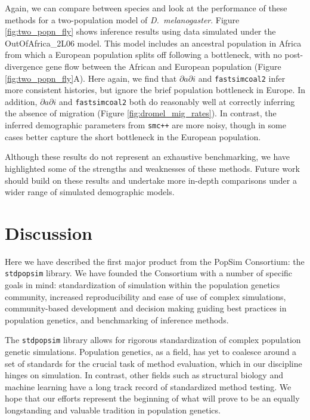 \documentclass[12pt,halfline,a4paper]{ouparticle}
\newcommand{\stdpopsim}{\texttt{stdpopsim}\xspace}
\newcommand{\dadi}{$\partial a \partial i$\xspace}
\newcommand{\smcpp}{\texttt{smc++}\xspace}
\newcommand{\fastsimcoal}{\texttt{fastsimcoal2}\xspace}
\begin{document}
Again, we can compare between species and look at the performance of these methods
for a two-population model of \textit{D.~melanogaster}. Figure
\ref{fig:two_popn_fly} shows inference results using data simulated under 
the OutOfAfrica\_2L06 model. This model includes an ancestral population in
Africa from which a European population splits off following a bottleneck, with no 
post-divergence gene flow between the African and European population (Figure \ref{fig:two_popn_fly}A).
Here again, we find that \dadi and \fastsimcoal infer more consistent histories,
but ignore the brief population bottleneck in Europe. In addition, \dadi
and \fastsimcoal both do reasonably well at correctly inferring the absence of
migration (Figure \ref{fig:dromel_mig_rates}). In contrast, the inferred
demographic parameters from \smcpp are more noisy, though in some cases better
capture the short bottleneck in the European population.

Although these results do not represent an exhaustive benchmarking,
we have highlighted some of the strengths and weaknesses of these methods.
Future work should build on these results and undertake more in-depth comparisons
under a wider range of simulated demographic models.

\section*{Discussion}

Here we have described the first major product from the PopSim Consortium:
the \stdpopsim library. We have founded the Consortium with a number of specific goals in mind:
standardization of simulation within the population genetics community,
increased reproducibility and ease of use of complex simulations,
community-based development and decision making guiding best practices in population genetics,
and benchmarking of inference methods.

The \stdpopsim library allows for rigorous
standardization of complex population genetic simulations. Population genetics, as a field,
has yet to coalesce around a set of standards for the crucial task of method
evaluation, which in our discipline hinges on simulation. In contrast, other fields such as
structural biology \citep{moult1995large} and machine learning \citep{russakovsky2015imagenet} have a long track record
of standardized method testing. We hope that our efforts represent the beginning of what
will prove to be an equally longstanding and valuable tradition in population genetics.
\end{document}
